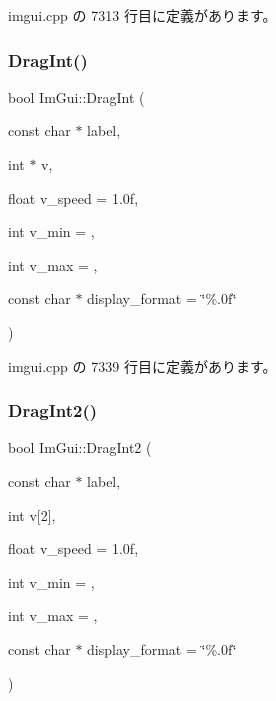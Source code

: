  imgui.\+cpp の 7313 行目に定義があります。

\mbox{\label{namespace_im_gui_abc3ac739a79de5897b61df4e6764fc9e}} 
\subsubsection{\texorpdfstring{Drag\+Int()}{DragInt()}}
{\footnotesize\ttfamily bool Im\+Gui\+::\+Drag\+Int (\begin{DoxyParamCaption}\item[{const char $\ast$}]{label,  }\item[{int $\ast$}]{v,  }\item[{float}]{v\+\_\+speed = {\ttfamily 1.0f},  }\item[{int}]{v\+\_\+min = {},  }\item[{int}]{v\+\_\+max = {},  }\item[{const char $\ast$}]{display\+\_\+format = {\ttfamily \char`\"{}\%.0f\char`\"{}} }\end{DoxyParamCaption})}



 imgui.\+cpp の 7339 行目に定義があります。

\mbox{\label{namespace_im_gui_aa74f28deeb62f0aa96e1c34b27e7bcd9}} 
\subsubsection{\texorpdfstring{Drag\+Int2()}{DragInt2()}}
{\footnotesize\ttfamily bool Im\+Gui\+::\+Drag\+Int2 (\begin{DoxyParamCaption}\item[{const char $\ast$}]{label,  }\item[{int}]{v\mbox{[}2\mbox{]},  }\item[{float}]{v\+\_\+speed = {\ttfamily 1.0f},  }\item[{int}]{v\+\_\+min = {},  }\item[{int}]{v\+\_\+max = {},  }\item[{const char $\ast$}]{display\+\_\+format = {\ttfamily \char`\"{}\%.0f\char`\"{}} }\end{DoxyParamCaption})}



